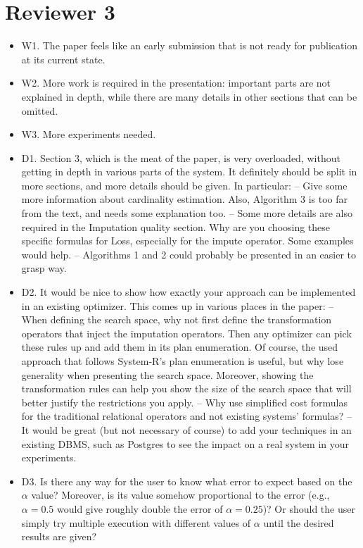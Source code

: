 \documentclass[draft,12pt]{article}
\begin{document}
\section{Reviewer 3}
\begin{itemize}
\item W1. The paper feels like an early submission that is not ready for publication at its current state.

\item W2. More work is required in the presentation: important parts are not explained in depth, while there are many details in other sections that can be omitted.

\item W3. More experiments needed.

\item D1. Section 3, which is the meat of the paper, is very overloaded, without getting in depth in various parts of the system. It definitely should be split in more sections, and more details should be given. In particular:
-- Give some more information about cardinality estimation. Also, Algorithm 3 is too far from the text, and needs some explanation too.
-- Some more details are also required in the Imputation quality section. Why are you choosing these specific formulas for Loss, especially for the impute operator. Some examples would help.
-- Algorithms 1 and 2 could probably be presented in an easier to grasp way.

\item D2. It would be nice to show how exactly your approach can be implemented in an existing optimizer. This comes up in various places in the paper:
-- When defining the search space, why not first define the transformation operators that inject the imputation operators. Then any optimizer can pick these rules up and add them in its plan enumeration. Of course, the used approach that follows System-R's plan enumeration is useful, but why lose generality when presenting the search space. Moreover, showing the transformation rules can help you show the size of the search space that will better justify the restrictions you apply.
-- Why use simplified cost formulas for the traditional relational operators and not existing systems' formulas?
-- It would be great (but not necessary of course) to add your techniques in an existing DBMS, such as Postgres to see the impact on a real system in your experiments.

\item D3. Is there any way for the user to know what error to expect based on the $\alpha$ value? Moreover, is its value somehow proportional to the error (e.g., $\alpha=0.5$ would give roughly double the error of $\alpha=0.25$)? Or should the user simply try multiple execution with different values of $\alpha$ until the desired results are given?


\end{itemize}
\end{document}
